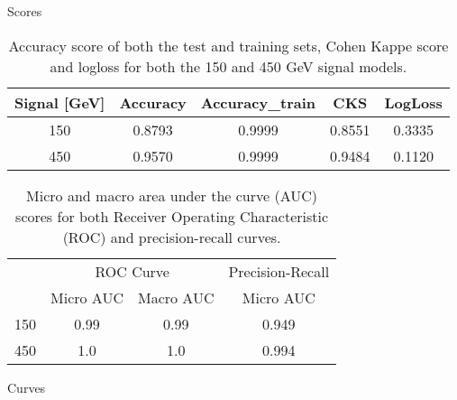 \documentclass[notes]{beamer}
\begin{document}
	\begin{frame}[t]{Scores}
		\begin{table}[htb!]
			\centering
			\begin{tabular}{ |c|c|c|c|c| }
				\hline \rule{0pt}{13pt}
				Signal [GeV] & Accuracy & Accuracy\_train & CKS & LogLoss  \\
				\hline \rule{0pt}{13pt}
				150 & 0.8793 & 0.9999 & 0.8551 & 0.3335 \\
				\hline \rule{0pt}{13pt}
				450 & 0.9570 & 0.9999 & 0.9484 & 0.1120 \\
				\hline
			\end{tabular}	         
			\caption{Accuracy score of both the test and training sets, Cohen Kappe score and logloss for both the 150 and 450 GeV signal models.}
			\label{tab:Test}
		\end{table}
		\begin{table}[htb!]
			\centering
			\begin{tabular}{ |c|c|c|c| }
				\hline \rule{0pt}{13pt}
				\multirow{2}{*}{Signal [GeV]} & \multicolumn{2}{c|}{ROC Curve} & \multicolumn{1}{c|}{Precision-Recall}\\
				\cline{2-4} \rule{0pt}{13pt}
				 & Micro AUC & Macro AUC & Micro AUC  \\
				\hline \rule{0pt}{13pt}
				150 & 0.99 & 0.99 & 0.949 \\
				\hline \rule{0pt}{13pt}
				450 & 1.0 & 1.0 & 0.994  \\
				\hline
			\end{tabular}	         
			\caption{Micro and macro area under the curve (AUC) scores for both Receiver Operating Characteristic (ROC) and precision-recall curves.}
			\label{tab:AUC}
		\end{table}
	\end{frame}


	\begin{frame}[t]{Curves}
		\begin{figure}[h]
			\centering
			\\
			\centering
		\end{figure}
	\end{frame}
\end{document}
